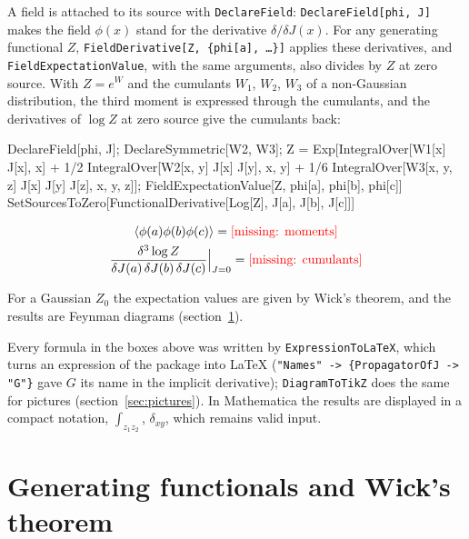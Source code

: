 \documentclass[11pt,a4paper]{article}
\newcommand{\formula}[1]{\IfFileExists{figures/formula_#1.tex}{}{\text{\textcolor{red}{[missing: \detokenize{#1}]}}}}
\newcommand{\formulasplit}[1]{\IfFileExists{figures/formula_#1_split.tex}{}{\formula{#1}}}
\newcommand{\pkg}[1]{\texttt{#1}}
\begin{document}
A field is attached to its source with \pkg{DeclareField}: \pkg{DeclareField[phi, J]} makes the field $\phi(x)$ stand
for the derivative $\delta/\delta J(x)$. For any generating functional $Z$, \pkg{FieldDerivative[Z, \{phi[a], \dots\}]}
applies these derivatives, and \pkg{FieldExpectationValue}, with the same arguments, also divides by $Z$ at zero source.
With $Z=e^{W}$ and the cumulants $W_1$, $W_2$, $W_3$ of a non-Gaussian distribution, the third moment is expressed through
the cumulants, and the derivatives of $\log Z$ at zero source give the cumulants back:
\begin{code}
DeclareField[phi, J]; DeclareSymmetric[W2, W3];
Z = Exp[IntegralOver[W1[x] J[x], {x}] + 1/2 IntegralOver[W2[x, y] J[x] J[y], {x, y}] +
    1/6 IntegralOver[W3[x, y, z] J[x] J[y] J[z], {x, y, z}]];
FieldExpectationValue[Z, {phi[a], phi[b], phi[c]}]
SetSourcesToZero[FunctionalDerivative[Log[Z], J[a], J[b], J[c]]]
\end{code}
\begin{outputbox}
\vspace{-6pt}
\begin{gather*}
\langle\phi(a)\phi(b)\phi(c)\rangle=\formulasplit{moments}\\
\frac{\delta^3\log Z}{\delta J(a)\,\delta J(b)\,\delta J(c)}\Big|_{J=0}=\formula{cumulants}
\end{gather*}
\end{outputbox}
For a Gaussian $Z_0$ the expectation values are given by Wick's theorem, and the results are Feynman diagrams
(section~\ref{sec:wick}).

\begin{keypoint}
Every formula in the boxes above was written by \pkg{ExpressionToLaTeX}, which turns an expression of the package into
\LaTeX{} (\pkg{"Names" -> \{PropagatorOfJ -> "G"\}} gave $G$ its name in the implicit derivative); \pkg{DiagramToTikZ}
does the same for pictures (section~\ref{sec:pictures}). In Mathematica the results are displayed in a compact notation,
$\int_{z_1z_2}$, $\delta_{xy}$, which remains valid input.
\end{keypoint}

\section{Generating functionals and Wick's theorem}\label{sec:wick}
\end{document}
